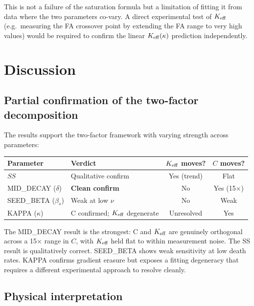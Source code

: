 \documentclass[11pt,a4paper]{article}
\begin{document}
This is not a failure of the saturation formula but a limitation of fitting it from
data where the two parameters co-vary.  A direct experimental test of $K_{\rm eff}$
(e.g.\ measuring the FA crossover point by extending the FA range to very high values)
would be required to confirm the linear $K_{\rm eff}(\kappa)$ prediction independently.

\section{Discussion}

\subsection{Partial confirmation of the two-factor decomposition}

The results support the two-factor framework with varying strength across parameters:

\begin{center}
\begin{tabular}{llcc}
\toprule
Parameter & Verdict & $K_{\rm eff}$ moves? & $C$ moves? \\
\midrule
$SS$ & Qualitative confirm & Yes (trend) & Flat \\
MID\_DECAY ($\delta$) & \textbf{Clean confirm} & No & Yes (15$\times$) \\
SEED\_BETA ($\beta_s$) & Weak at low $\nu$ & No & Weak \\
KAPPA ($\kappa$) & C confirmed; $K_{\rm eff}$ degenerate & Unresolved & Yes \\
\bottomrule
\end{tabular}
\end{center}

The MID\_DECAY result is the strongest: C and $K_{\rm eff}$ are genuinely orthogonal
across a 15$\times$ range in $C$, with $K_{\rm eff}$ held flat to within measurement
noise.  The SS result is qualitatively correct.  SEED\_BETA shows weak sensitivity
at low death rates.  KAPPA confirms gradient erasure but exposes a fitting degeneracy
that requires a different experimental approach to resolve cleanly.

\subsection{Physical interpretation}
\end{document}

